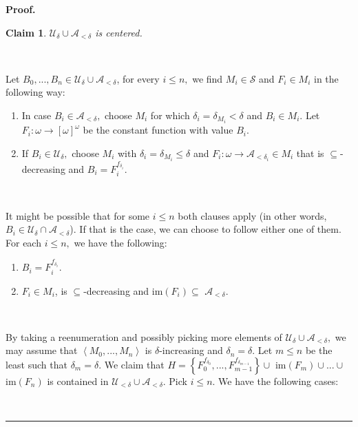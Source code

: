 \documentclass{article}%
\newtheorem{claim}[theorem]{Claim}
\newenvironment{proof}[1][Proof]{\noindent\textbf{#1.} }{\ \rule{0.5em}{0.5em}}
\begin{document}
\begin{proof}
\begin{claim}
$\mathcal{U}_{\delta}\cup\mathcal{A}_{<\delta}$ is centered.
\end{claim}

\qquad\ \ \ 

Let $B_{0},...,B_{n}\in\mathcal{U}_{\delta}\cup\mathcal{A}_{<\delta}$, for
every $i\leq n,$ we find $M_{i}\in\mathcal{S}$ and $F_{i}\in M_{i}$ in the
following way:

\begin{enumerate}
\item In case $B_{i}\in\mathcal{A}_{<\delta},$ choose $M_{i}$ for which
$\delta_{i}=\delta_{M_{i}}<\delta$ and $B_{i}\in M_{i}.$ Let $F_{i}%
:\omega\longrightarrow\left[  \omega\right]  ^{\omega}$ be the constant
function with value $B_{i}.$

\item If $B_{i}\in\mathcal{U}_{\delta},$ choose $M_{i}$ with $\delta
_{i}=\delta_{M_{i}}\leq\delta$ and $F_{i}:\omega\longrightarrow\mathcal{A}%
_{<\delta_{i}}\in M_{i}$ that is $\subseteq$-decreasing and $B_{i}%
=F_{i}^{f_{\delta_{i}}}.$
\end{enumerate}

\qquad\ \ 

It might be possible that for some $i\leq n$ both clauses apply (in other
words, $B_{i}\in\mathcal{U}_{\delta}\cap\mathcal{A}_{<\delta}$). If that is
the case, we can choose to follow either one of them. For each $i\leq n,$ we
have the following:

\begin{enumerate}
\item $B_{i}=F_{i}^{f_{\delta_{i}}}.$

\item $F_{i}\in M_{i}$, is $\subseteq$-decreasing and \textsf{im}$\left(
F_{i}\right)  \subseteq$ $\mathcal{A}_{<\delta}.$
\end{enumerate}

\qquad\ \ 

By taking a reenumeration and possibly picking more elements of $\mathcal{U}%
_{\delta}\cup\mathcal{A}_{<\delta},$ we may assume that $\left\langle
M_{0},...,M_{n}\right\rangle $ is $\delta$-increasing and $\delta_{n}=\delta.$
Let $m\leq n$ be the least such that $\delta_{m}=\delta.$ We claim that
$H=\left\{  F_{0}^{f_{\delta_{0}}},...,F_{m-1}^{f_{\delta_{m-1}}}\right\}
\cup$ \textsf{im}$\left(  F_{m}\right)  \cup...\cup$ \textsf{im}$\left(
F_{n}\right)  $ is contained in $\mathcal{U}_{<\delta}\cup\mathcal{A}%
_{<\delta}.$ Pick $i\leq n.$ We have the following cases:


\end{proof}
\end{document}
